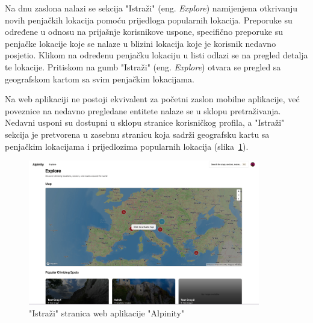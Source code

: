 Na dnu zaslona nalazi se sekcija "Istraži" (eng. \textit{Explore}) namijenjena otkrivanju novih penjačkih lokacija pomoću prijedloga popularnih lokacija. Preporuke su određene u odnosu na prijašnje korisnikove uspone, specifično preporuke su penjačke lokacije koje se nalaze u blizini lokacija koje je korisnik nedavno posjetio. Klikom na određenu penjačku lokaciju u listi odlazi se na pregled detalja te lokacije. Pritiskom na gumb "Istraži" (eng. \textit{Explore}) otvara se pregled sa geografskom kartom sa svim penjačkim lokacijama.

Na web aplikaciji ne postoji ekvivalent za početni zaslon mobilne aplikacije, već poveznice na nedavno pregledane entitete nalaze se u sklopu pretraživanja. Nedavni usponi su dostupni u sklopu stranice korisničkog profila, a "Istraži" sekcija je pretvorena u zasebnu stranicu koja sadrži geografsku kartu sa penjačkim lokacijama i prijedlozima popularnih lokacija (slika~\ref{fig:istrazivanje_web}).

\begin{figure}[H]
    \centering
    \includegraphics[width=0.9\textwidth]{images/implementacija/web/explore.jpeg}
    \caption{"Istraži" stranica web aplikacije "Alpinity"}
    \label{fig:istrazivanje_web}
\end{figure}